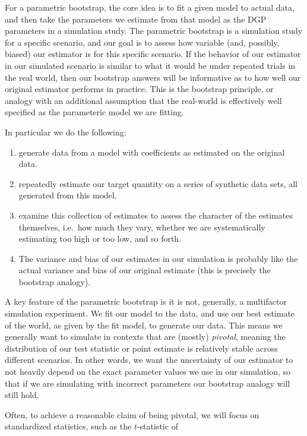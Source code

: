 \documentclass[
]{book}
\providecommand{\tightlist}{%
  \setlength{\itemsep}{0pt}\setlength{\parskip}{0pt}}
\begin{document}
For a parametric bootstrap, the core idea is to fit a given model to actual data, and then take the parameters we estimate from that model as the DGP parameters in a simulation study.
The parametric bootstrap is a simulation study for a specific scenario, and our goal is to assess how variable (and, possibly, biased) our estimator is for this specific scenario.
If the behavior of our estimator in our simulated scenario is similar to what it would be under repeated trials in the real world, then our bootstrap answers will be informative as to how well our original estimator performs in practice.
This is the bootstrap principle, or analogy with an additional assumption that the real-world is effectively well specified as the parameteric model we are fitting.

In particular we do the following:

\begin{enumerate}
\def\labelenumi{\arabic{enumi}.}
\tightlist
\item
  generate data from a model with coefficients as estimated on the original data.
\item
  repeatedly estimate our target quantity on a series of synthetic data sets, all generated from this model.
\item
  examine this collection of estimates to assess the character of the estimates themselves, i.e.~how much they vary, whether we are systematically estimating too high or too low, and so forth.
\item
  The variance and bias of our estimates in our simulation is probably like the actual variance and bias of our original estimate (this is precisely the bootstrap analogy).
\end{enumerate}

A key feature of the parametric bootstrap is it is not, generally, a multifactor simulation experiment.
We fit our model to the data, and use our best estimate of the world, as given by the fit model, to generate our data.
This means we generally want to simulate in contexts that are (mostly) \emph{pivotal}, meaning the distribution of our test statistic or point estimate is relatively stable across different scenarios.
In other words, we want the uncertainty of our estimator to not heavily depend on the exact parameter values we use in our simulation, so that if we are simulating with incorrect parameters our bootstrap analogy will still hold.

Often, to achieve a reasonable claim of being pivotal, we will focus on standardized statistics, such as the \(t\)-statistic of
\end{document}
